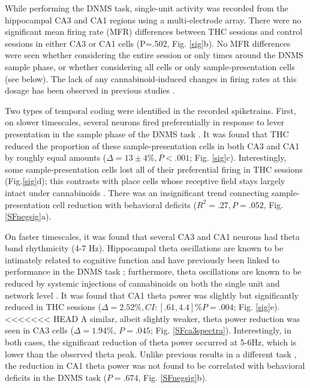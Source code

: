 \documentclass[11pt,a4paper,final]{article}
\begin{document}
While performing the DNMS task, single-unit activity was recorded from the hippocampal CA3 and CA1 regions using a multi-electrode array.
There were no significant mean firing rate (MFR) differences between THC sessions and control sessions in either CA3 or CA1 cells (P=.502, Fig. \ref{sig}b).
No MFR differences were seen whether considering the entire session or only times around the DNMS sample phase, or whether considering all cells or only sample-presentation cells (see below).
The lack of any cannabinoid-induced changes in firing rates at this dosage has been observed in previous studies \citep{robbe06,goon10}.

Two types of temporal coding were identified in the recorded spiketrains.
First, on slower timescales, several neurons fired preferentially in response to lever presentation in the sample phase of the DNMS task \citep{hampson99}.
It was found that THC reduced the proportion of these sample-presentation cells in both CA3 and CA1 by roughly equal amounts ($\Delta=13\pm4\%, P<.001$; Fig. \ref{sig}c).
Interestingly, some sample-presentation cells lost all of their preferential firing in THC sessions (Fig.\ref{sig}d); this contrasts with place cells whose receptive field stays largely intact under cannabinoids \citep{robbe09}.
There was an insignificant trend connecting sample-presentation cell reduction with behavioral deficits ($R^2=.27, P=.052$, Fig. \ref{SFnegsig}a).

On faster timescales, it was found that several CA3 and CA1 neurons had theta band rhythmicity (4-7 Hz).
Hippocampal theta oscillations are known to be intimately related to cognitive function \citep{buzsaki06,colgin13,moser13} and have previously been linked to performance in the DNMS task \citep{hasselmo10};
furthermore, theta oscillations are known to be reduced by systemic injections of cannabinoids on both the single unit \citep{robbe06} and network level \citep{kocsis08}.
It was found that CA1 theta power was slightly but significantly reduced in THC sessions ($\Delta=2.52\%, CI:[.61,4.4]\% P=.004$; Fig. \ref{sig}e).
<<<<<<< HEAD
A similar, albeit slightly weaker, theta power reduction was seen in CA3 cells ($\Delta=1.94\%$, $P=.045$; Fig. \ref{SFca3spectra}).
Interestingly, in both cases, the significant reduction of theta power occurred at 5-6Hz, which is lower than the observed theta peak.   
Unlike previous results in a different task \citep{robbe06}, the reduction in CA1 theta power was not found to be correlated with behavioral deficits in the DNMS task ($P=.674$, Fig. \ref{SFnegsig}b).
\end{document}
